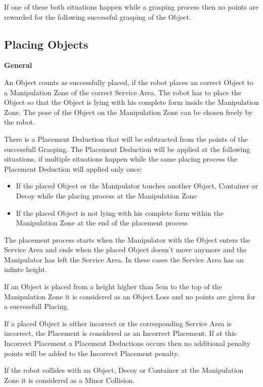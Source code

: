If one of these both situations happen while a grasping process then no points are rewarded for the following successful grasping of the Object.

\subsection{Placing Objects} \label{ssec:PlacingObjects}

\textbf{General}

An Object counts as successfully placed, if the robot places an correct Object to a Manipulation Zone of the correct Service Area. The robot has to place the Object so that the Object is lying with his complete form inside the Manipulation Zone. The pose of the Object on the Manipulation Zone can be chosen freely by the robot.

There is a Placement Deduction that will be subtracted from the points of the successfull Grasping. The Placement Deduction will be applied at the following situations, if multiple situations happen while the same placing process the Placement Deduction will applied only once:

\begin{itemize}
	\item If the placed Object or the Manipulator touches another Object, Container or Decoy while the placing process at the Manipulation Zone 
	\item If the placed Object is not lying with his complete form within the Manipulation Zone at the end of the placement process
\end{itemize}

The placement process starts when the Manipulator with the Object enters the Service Area and ends when the placed Object doesn't move anymore and the Manipulator has left the Service Area. In these cases the Service Area has an infinte height.


If an Object is placed from a height higher than $5\si{\centi\meter}$ to the top of the Manipulation Zone it is considered as an Object Loss and no points are given for a successfull Placing.

If a placed Object is either incorrect or the corresponding Service Area is incorrect, the Placement is considered as an Incorrect Placement. If at this Incorrect Placement a Placement Deductions occurs then no additional penalty points will be added to the Incorrect Placement penalty.

If the robot collides with an Object, Decoy or Container at the Manipulation Zone it is considered as a Minor Collision.

